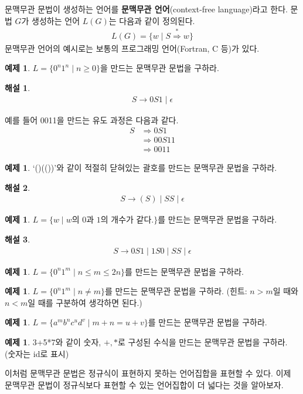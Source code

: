 \documentclass[b5paper, 11pt]{book}
\theoremstyle{definition}
\newtheorem{ex}[defn]{예제}
\newtheorem*{ans*}{해설}
\begin{document}
문맥무관 문법이 생성하는 언어를 \textbf{문맥무관 언어}(context-free language)라고 한다. 문법 $G$가 생성하는 언어 $L(G)$는 다음과 같이 정의된다.
\begin{align*}
    L(G) = \{ w \; \vert \; S \overset{*}{\Rightarrow} w \}
\end{align*}
문맥무관 언어의 예시로는 보통의 프로그래밍 언어(Fortran, C 등)가 있다.
\begin{ex}\label{0n1n_CFG}
$L = \{ 0^n 1^n \; \vert \; n \ge 0\}$을 만드는 문맥무관 문법을 구하라.
\end{ex}
\begin{ans*}
    \begin{align*}
        S \rightarrow 0S1 \; \vert \; \epsilon 
    \end{align*}
\end{ans*}
예를 들어 0011을 만드는 유도 과정은 다음과 같다.
\begin{align*}
    S &\Rightarrow 0S1 \\
    &\Rightarrow 00S11 \\ 
    &\Rightarrow 0011
\end{align*}
\begin{ex}\label{bracket_CFG}
     `()(())'와 같이 적절히 닫혀있는 괄호를 만드는 문맥무관 문법을 구하라.
\end{ex} 
\begin{ans*}
    \begin{align*}
        S \rightarrow (S) \; \vert \; SS \; \vert \; \epsilon 
     \end{align*}
\end{ans*}
\begin{ex}\label{same0and1}
    $L = \{w \;\vert\; w\text{의 0과 1의 개수가 같다.}\}$를 만드는 문맥무관 문법을 구하라.
\end{ex}
\begin{ans*}
    \begin{align*}
        S \rightarrow 0S1 \;\vert\; 1S0 \;\vert\; SS \;\vert\; \epsilon
    \end{align*}
\end{ans*}
\begin{ex} $L = \{ 0^n 1^m \; \vert \; n \le m \le 2n\}$를 만드는 문맥무관 문법을 구하라.
\end{ex}
\begin{ex} 
    $L = \{ 0^n 1^m \; \vert \; n \neq m\}$를 만드는 문맥무관 문법을 구하라. (힌트: $n>m$일 때와 $n < m$일 때를 구분하여 생각하면 된다.)
\end{ex}
\begin{ex} $L = \{ a^m b^n c^u d^v \;\vert\; m+n = u+v\}$를 만드는 문맥무관 문법을 구하라.
\end{ex}
\begin{ex} \label{3+5*7}
    3+5*7와 같이 숫자, $+, *$로 구성된 수식을 만드는 문맥무관 문법을 구하라. (숫자는 id로 표시)
\end{ex}
이처럼 문맥무관 문법은 정규식이 표현하지 못하는 언어집합을 표현할 수 있다. 이제 문맥무관 문법이 정규식보다 표현할 수 있는 언어집합이 더 넓다는 것을 알아보자.
\end{document}
